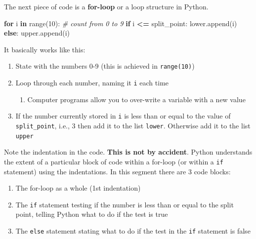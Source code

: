 \documentclass[
  letterpaper,
]{scrbook}
\newenvironment{Shaded}{\begin{snugshade}}{\end{snugshade}}
\newcommand{\BuiltInTok}[1]{#1}
\newcommand{\CommentTok}[1]{\textcolor[rgb]{0.56,0.35,0.01}{\textit{#1}}}
\newcommand{\ControlFlowTok}[1]{\textcolor[rgb]{0.13,0.29,0.53}{\textbf{#1}}}
\newcommand{\DecValTok}[1]{\textcolor[rgb]{0.00,0.00,0.81}{#1}}
\newcommand{\KeywordTok}[1]{\textcolor[rgb]{0.13,0.29,0.53}{\textbf{#1}}}
\newcommand{\NormalTok}[1]{#1}
\newcommand{\OperatorTok}[1]{\textcolor[rgb]{0.81,0.36,0.00}{\textbf{#1}}}
\providecommand{\tightlist}{%
  \setlength{\itemsep}{0pt}\setlength{\parskip}{0pt}}
\begin{document}
The next piece of code is a \textbf{for-loop} or a loop structure in Python.

\begin{Shaded}
\begin{Highlighting}[]
\ControlFlowTok{for}\NormalTok{ i }\KeywordTok{in} \BuiltInTok{range}\NormalTok{(}\DecValTok{10}\NormalTok{):  }\CommentTok{\# count from 0 to 9}
    \ControlFlowTok{if}\NormalTok{ i }\OperatorTok{\textless{}=}\NormalTok{ split\_point:}
\NormalTok{        lower.append(i)}
    \ControlFlowTok{else}\NormalTok{:}
\NormalTok{        upper.append(i)}
\end{Highlighting}
\end{Shaded}

It basically works like this:

\begin{enumerate}
\def\labelenumi{\arabic{enumi}.}
\tightlist
\item
  State with the numbers 0-9 (this is achieved in \texttt{range(10)})
\item
  Loop through each number, naming it \texttt{i} each time

  \begin{enumerate}
  \def\labelenumii{\arabic{enumii}.}
  \tightlist
  \item
    Computer programs allow you to over-write a variable with a new value
  \end{enumerate}
\item
  If the number currently stored in \texttt{i} is less than or equal to the value of \texttt{split\_point}, i.e., 3 then add it to the list \texttt{lower}. Otherwise add it to the list \texttt{upper}
\end{enumerate}

Note the indentation in the code. \textbf{This is not by accident}. Python understands the extent of a particular block of code within a for-loop (or within a \texttt{if} statement) using the indentations. In this segment there are 3 code blocks:

\begin{enumerate}
\def\labelenumi{\arabic{enumi}.}
\tightlist
\item
  The for-loop as a whole (1st indentation)
\item
  The \texttt{if} statement testing if the number is less than or equal to the split point, telling Python what to do if the test is true
\item
  The \texttt{else} statement stating what to do if the test in the \texttt{if} statement is false
\end{enumerate}
\end{document}

